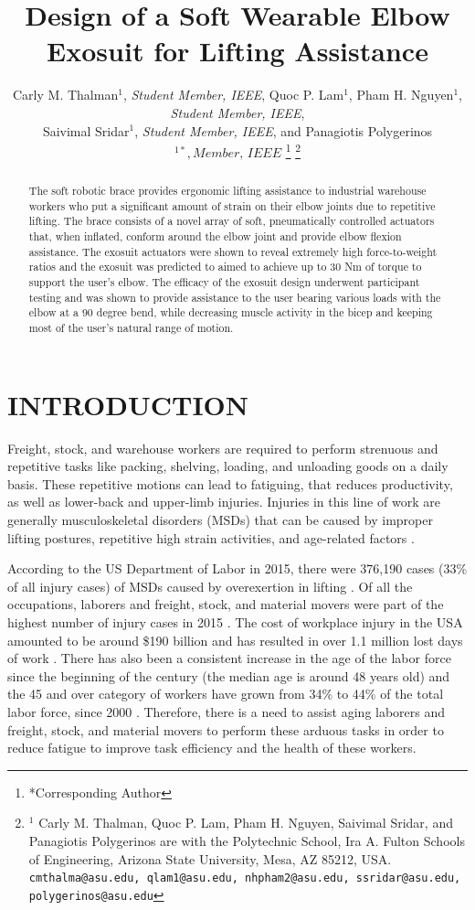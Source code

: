 \documentclass[letterpaper, 10 pt, conference]{ieeeconf}  %
\title{\LARGE \bf
Design of a Soft Wearable Elbow Exosuit for Lifting Assistance
}
\author{Carly M. Thalman$^{1}$, \textit{Student Member, IEEE}, Quoc P. Lam$^{1}$, Pham H. Nguyen$^{1}$, \textit{Student Member, IEEE}, 
\\Saivimal Sridar$^{1}$, \textit{Student Member, IEEE}, and Panagiotis Polygerinos$^{1*}, \textit{Member, IEEE}$%
\thanks{*Corresponding Author}%
\thanks{$^{1}$ Carly M. Thalman, Quoc P. Lam, Pham H. Nguyen, Saivimal Sridar, and Panagiotis Polygerinos are with the Polytechnic School, Ira A. Fulton Schools of Engineering, Arizona State University, Mesa, AZ 85212, USA.
        {\tt\small cmthalma@asu.edu, qlam1@asu.edu, nhpham2@asu.edu, ssridar@asu.edu, polygerinos@asu.edu}}%
}
\begin{document}
\maketitle
\thispagestyle{empty}
\pagestyle{empty}


\begin{abstract}

The soft robotic brace provides ergonomic lifting assistance to industrial warehouse workers who put a significant amount of strain on their elbow joints due to repetitive lifting. The brace consists of a novel array of soft, pneumatically controlled actuators that, when inflated, conform around the elbow joint and provide elbow flexion assistance.  The exosuit actuators were shown to reveal extremely high force-to-weight ratios and the exosuit was predicted to aimed to achieve up to 30 Nm of torque to support the user’s elbow.  The efficacy of the exosuit design underwent participant testing and was shown to provide assistance to the user bearing various loads with the elbow at a 90 degree bend, while decreasing muscle activity in the bicep and keeping most of the user's natural range of motion.



\end{abstract}


\section{INTRODUCTION}

Freight, stock, and warehouse workers are required to perform strenuous and repetitive tasks like packing, shelving, loading, and unloading goods on a daily basis. These repetitive motions can lead to fatiguing, that reduces productivity, as well as lower-back and upper-limb injuries. Injuries in this line of work are generally musculoskeletal disorders (MSDs) that can be caused by improper lifting postures, repetitive high strain activities, and age-related factors \cite{BLS2017}. 

According to the US Department of Labor in 2015, there were 376,190 cases (33\% of all injury cases) of MSDs caused by overexertion in lifting \cite{BLS2016}. Of all the occupations, laborers and freight, stock, and material movers were part of the highest number of injury cases in 2015 \cite{BLS2016}. The cost of workplace injury in the USA amounted to be around \$190 billion and has resulted in over 1.1 million lost days of work \cite{Leigh2011}. There has also been a consistent increase in the age of the labor force since the beginning of the century (the median age is around 48 years old) and the 45 and over category of workers have grown from 34\% to 44\% of the total labor force, since 2000 \cite{Mislinski2017}. Therefore, there is a need to assist aging laborers and freight, stock, and material movers to perform these arduous tasks in order to reduce fatigue to improve task efficiency and the health of these workers. 
\end{document}
